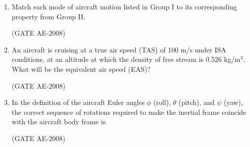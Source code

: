 \documentclass[journal,12pt,onecolumn]{IEEEtran}
\theoremstyle{remark}
\begin{document}
\begin{enumerate}
    \quad

    \item  Match each mode of aircraft motion listed in Group I to its corresponding property from Group II.


    \begin{enumerate}
    \end{enumerate}
    \hfill(GATE AE-2008)

    \quad

    \item An aircraft is cruising at a true air speed (TAS) of 100 m/s under ISA conditions, at an altitude at which the density of free stream is 0.526 kg/m$^3$. What will be the equivalent air speed (EAS)?
    \begin{enumerate}
    \end{enumerate}
    \hfill(GATE AE-2008)

    \quad

\item In the definition of the aircraft Euler angles $\phi$ (roll), $\theta$ (pitch), and $\psi$ (yaw), the correct sequence of rotations required to make the inertial frame coincide with the aircraft body frame is  
\begin{enumerate}
\end{enumerate}
    \hfill(GATE AE-2008)


\end{enumerate}
\end{document}
